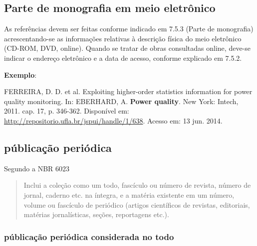 \subsection{Parte de monografia em meio eletrônico}

As referências devem ser feitas conforme indicado em 7.5.3 (Parte de monografia) acrescentando-se as informações relativas à descrição física do meio eletrônico (CD-ROM, DVD, online). Quando se tratar de obras consultadas online, deve-se indicar o endereço eletrônico e a data de acesso, conforme explicado em 7.5.2.

\begin{exemplomanual}
\textbf{Exemplo}:\\
\begin{singlespace}
FERREIRA, D. D. et al. Exploiting higher-order statistics information for power quality monitoring. In: EBERHARD, A. \textbf{Power quality}. New York: Intech, 2011. cap. 17, p. 346-362. Disponível em:
\url{http://repositorio.ufla.br/jspui/handle/1/638}.  Acesso em: 13 jun. 2014.
\end{singlespace}
\end{exemplomanual}


\subsection{públicação periódica}

Segundo a NBR 6023 \cite[p.5]{NBR6023:2002}

\begin{quote}
Inclui a coleção como um todo, fascículo ou número de revista, número de jornal, caderno etc. na íntegra, e a matéria existente em um número, volume ou fascículo de periódico (artigos científicos de revistas, editoriais, matérias jornalísticas, seções, reportagens etc.).
\end{quote}


\subsubsection{públicação periódica considerada no todo}

\begin{flushleft}
\begin{singlespace}
\end{singlespace}
\end{flushleft}


